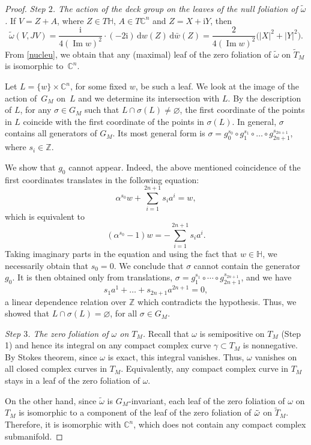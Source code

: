\documentclass[10pt,a4paper]{amsart}
\renewcommand{\H}{{\mathbb H}}
\newcommand{\6}{\partial}
\renewcommand{\Im}{\operatorname{Im}}
\numberwithin{equation}{section}
\begin{document}
\begin{proof}
{\it Step $2$. The action of the deck group on the leaves of the null foliation of $\tilde\omega$.}
 If $V=Z+A$, where $Z \in T\mathbb{H}$, $A \in T\mathbb{C}^n$ and $Z=X+\mathrm{i}Y$, then
\begin{equation} \label{nucleu}
\tilde{\omega}(V, JV) = \frac{\mathrm{i}}{4 (\Im w)^2} \cdot (-2\mathrm{i}) \, \mathrm{d}w(Z) \, \mathrm{d}\bar{w}(Z) = \frac{2}{4 (\Im w)^2} \big(|X|^2 + |Y|^2\big).
\end{equation}
 From \eqref{nucleu}, we obtain that any (maximal) leaf of the zero foliation of $\tilde{\omega}$ on $\tilde T_M$ is isomorphic to~$\mathbb{C}^n$.


Let $L=\{w\} \times \mathbb{C}^n$, for some fixed $w$, be such a leaf. We look at the image of the action of~$G_M$ on~$L$ and we determine its intersection with $L$.
By the description of $L$, for any $\sigma \in G_M$ such that $L \cap \sigma(L) \neq \varnothing$, the first coordinate of the points in $L$ coincide with the first coordinate of the points in $\sigma(L)$.
In general, $\sigma$ contains all generators of $G_M$. Its most general form is $\sigma=g_0^{s_0} \circ g_1^{s_1}\circ \dots \circ g_{2n+1}^{s_{2n+1}}$, where $s_i \in \mathbb{Z}$.

We show that $g_0$ cannot appear.
Indeed, the above mentioned coincidence of the first coordinates translates in the following equation:
\begin{equation*}
\alpha^{s_0}w+\sum_{i=1}^{2n+1} s_i a^i=w,
\end{equation*}
which is equivalent to
\begin{equation*}
(\alpha^{s_0}-1)w=-\sum_{i=1} ^{2n+1} s_i a^i.
\end{equation*}
Taking imaginary parts in the equation and using the fact that $w \in \H$, we necessarily obtain that $s_0=0$.
We conclude that $\sigma$ cannot contain the generator $g_0$. It is then obtained only from translations, $\sigma=g_1^{s_1}\circ \cdots \circ g_{2n+1}^{s_{2n+1}}$, and we have
\begin{equation*}
s_1 a^1+ \dots +s_{2n+1} a^{2n+1}=0,
\end{equation*}
a linear dependence relation over $\mathbb{Z}$ which contradicts the hypothesis.
Thus, we showed that $L \cap \sigma(L) = \varnothing$, for all $\sigma \in G_M$.

{\it Step $3$. The zero foliation of $\omega$ on $T_M$.}
Recall that $\omega$ is semipositive on $T_M$ (Step 1) and hence its integral on any compact complex curve $\gamma \subset T_M$ is nonnegative. By Stokes theorem, since $\omega$ is exact, this integral vanishes. Thus, $\omega$ vanishes on all closed complex curves in $T_M$. Equivalently, any compact complex curve in $T_M$ stays in a leaf of the zero foliation of $\omega$.

On the other hand, since $\tilde{\omega}$ is $G_M$-invariant, each leaf of the zero foliation of $\omega$ on $T_M$ is isomorphic to a component of the leaf of the zero foliation of $\Tilde{\omega}$ on $\tilde T_M$. Therefore, it is isomorphic with $\mathbb{C}^n$, which does not contain any compact complex submanifold.
\end{proof}
\end{document}
